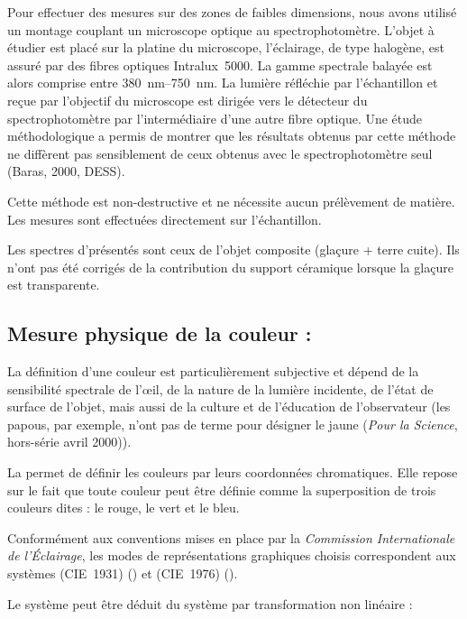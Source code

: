 Pour effectuer des mesures sur des zones de faibles dimensions, 
nous avons utilisé un montage couplant un microscope optique au 
spectrophotomètre. L'objet à étudier est placé sur la platine du 
microscope, l'éclairage, de type halogène, est assuré par des fibres 
optiques Intralux~5000. La gamme spectrale balayée est alors comprise 
entre \SIrange[range-phrase=\ et\ ]{380}{750}{\nm}. La lumière 
réfléchie par l'échantillon et reçue par l'objectif du microscope est 
dirigée vers le détecteur du spectrophotomètre par l'intermédiaire 
d'une autre fibre optique. Une étude méthodologique a permis de 
montrer que les résultats obtenus par cette méthode ne diffèrent pas 
sensiblement de ceux obtenus avec le spectrophotomètre seul (Baras, 
2000, DESS).

Cette méthode est non-destructive et ne nécessite aucun prélèvement de 
matière. Les mesures sont effectuées directement sur l'échantillon.

Les spectres d'\AO présentés sont ceux de l'objet composite (glaçure + terre cuite). Ils n'ont pas été corrigés de la contribution du support céramique lorsque la glaçure est transparente.

\subsection[Chromamétrie]{Mesure physique de la couleur : \CHRO}
La définition d'une couleur est particulièrement subjective et dépend 
de la sensibilité spectrale de l'{\oe}il, de la nature de la lumière 
incidente, de l'état de surface de l'objet, mais aussi de la culture 
et de l'éducation de l'observateur (les papous, par exemple, n'ont pas 
de terme pour désigner le jaune (\textit{Pour la Science}, hors-série 
avril 2000)).

La \CHRO permet de définir les couleurs par leurs
coordonnées chromatiques. Elle repose sur le fait que toute couleur
peut être définie comme la superposition de trois couleurs dites
 : le rouge, le vert et le bleu.

Conformément aux conventions mises en place par la \emph{Commission 
Internationale de l'Éclairage}, les modes de représentations 
graphiques choisis correspondent aux systèmes \Yxy (CIE~1931) 
() et \Lab (CIE~1976) ().

Le système \Lab peut être déduit du système \Yxy par transformation 
non linéaire :

